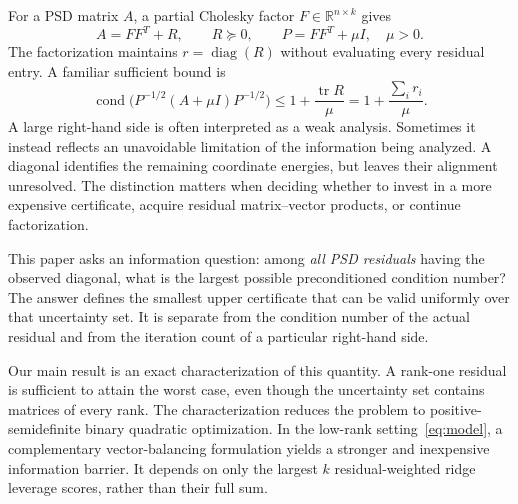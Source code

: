 \documentclass[11pt]{article}
\theoremstyle{definition}\newtheorem{definition}[theorem]{Definition}
\newcommand{\R}{\mathbb R}
\newcommand{\diag}{\operatorname{diag}}
\newcommand{\tr}{\operatorname{tr}}
\newcommand{\cond}{\operatorname{cond}}
\begin{document}
For a PSD matrix $A$, a partial Cholesky factor $F\in\R^{n\times k}$ gives
\begin{equation}\label{eq:model}
 A=FF^T+R,\qquad R\succeq0,\qquad P=FF^T+\mu I,\quad \mu>0.
\end{equation}
The factorization maintains $r=\diag(R)$ without evaluating every residual entry. A familiar sufficient bound is
\begin{equation}\label{eq:trace}
 \cond\bigl(P^{-1/2}(A+\mu I)P^{-1/2}\bigr)
 \le 1+\frac{\tr R}{\mu}=1+\frac{\sum_i r_i}{\mu}.
\end{equation}
A large right-hand side is often interpreted as a weak analysis. Sometimes it instead reflects an unavoidable limitation of the information being analyzed. A diagonal identifies the remaining coordinate energies, but leaves their alignment unresolved. The distinction matters when deciding whether to invest in a more expensive certificate, acquire residual matrix--vector products, or continue factorization.

This paper asks an information question: among \emph{all PSD residuals} having the observed diagonal, what is the largest possible preconditioned condition number? The answer defines the smallest upper certificate that can be valid uniformly over that uncertainty set. It is separate from the condition number of the actual residual and from the iteration count of a particular right-hand side.

Our main result is an exact characterization of this quantity. A rank-one residual is sufficient to attain the worst case, even though the uncertainty set contains matrices of every rank. The characterization reduces the problem to positive-semidefinite binary quadratic optimization. In the low-rank setting~\eqref{eq:model}, a complementary vector-balancing formulation yields a stronger and inexpensive information barrier. It depends on only the largest $k$ residual-weighted ridge leverage scores, rather than their full sum.
\end{document}
